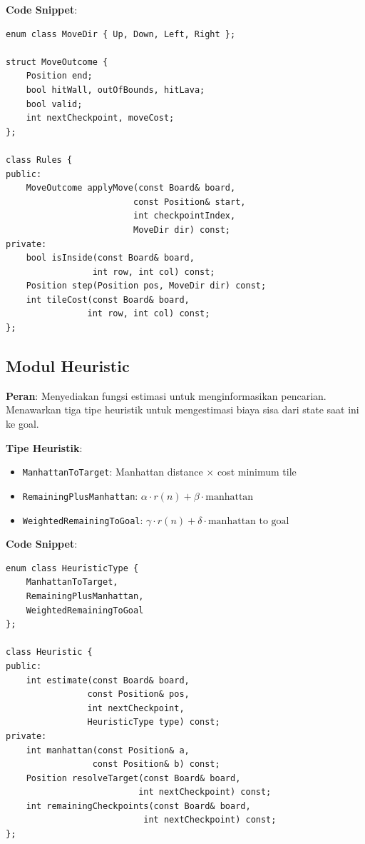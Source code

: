 \textbf{Code Snippet}:
\begin{tcolorbox}[colback=blue!5, title=Rules Class Header]
    \begin{verbatim}
enum class MoveDir { Up, Down, Left, Right };

struct MoveOutcome {
    Position end;
    bool hitWall, outOfBounds, hitLava;
    bool valid;
    int nextCheckpoint, moveCost;
};

class Rules {
public:
    MoveOutcome applyMove(const Board& board,
                         const Position& start,
                         int checkpointIndex,
                         MoveDir dir) const;
private:
    bool isInside(const Board& board, 
                 int row, int col) const;
    Position step(Position pos, MoveDir dir) const;
    int tileCost(const Board& board, 
                int row, int col) const;
};
\end{verbatim}
\end{tcolorbox}

\subsection{Modul Heuristic}

\textbf{Peran}: Menyediakan fungsi estimasi untuk menginformasikan pencarian. Menawarkan tiga tipe heuristik untuk mengestimasi biaya sisa dari state saat ini ke goal.

\textbf{Tipe Heuristik}:
\begin{itemize}
    \item \texttt{ManhattanToTarget}: Manhattan distance $\times$ cost minimum tile
    \item \texttt{RemainingPlusManhattan}: $\alpha \cdot r(n) + \beta \cdot \text{manhattan}$
    \item \texttt{WeightedRemainingToGoal}: $\gamma \cdot r(n) + \delta \cdot \text{manhattan to goal}$
\end{itemize}

\textbf{Code Snippet}:
\begin{tcolorbox}[colback=blue!5, title=Heuristic Class Header]
    \begin{verbatim}
enum class HeuristicType {
    ManhattanToTarget,
    RemainingPlusManhattan,
    WeightedRemainingToGoal
};

class Heuristic {
public:
    int estimate(const Board& board,
                const Position& pos,
                int nextCheckpoint,
                HeuristicType type) const;
private:
    int manhattan(const Position& a,
                 const Position& b) const;
    Position resolveTarget(const Board& board,
                          int nextCheckpoint) const;
    int remainingCheckpoints(const Board& board,
                           int nextCheckpoint) const;
};
\end{verbatim}
\end{tcolorbox}

